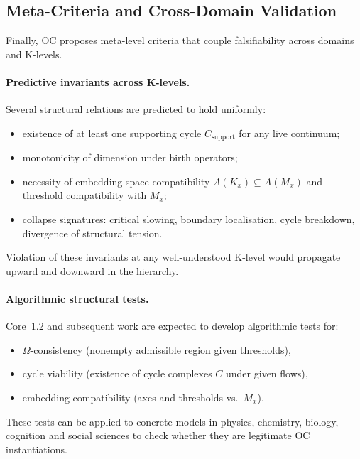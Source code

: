 \subsection{Meta-Criteria and Cross-Domain Validation}

Finally, OC proposes meta-level criteria that couple falsifiability across
domains and K-levels.

\paragraph{Predictive invariants across K-levels.}
Several structural relations are predicted to hold uniformly:
\begin{itemize}
  \item existence of at least one supporting cycle \(C_{\mathrm{support}}\)
        for any live continuum;
  \item monotonicity of dimension under birth operators;
  \item necessity of embedding-space compatibility
        \(A(K_x)\subseteq A(M_x)\) and threshold compatibility with \(M_x\);
  \item collapse signatures: critical slowing, boundary localisation,
        cycle breakdown, divergence of structural tension.
\end{itemize}
Violation of these invariants at any well-understood K-level would
propagate upward and downward in the hierarchy.

\paragraph{Algorithmic structural tests.}
Core~1.2 and subsequent work are expected to develop algorithmic tests for:
\begin{itemize}
  \item \(\Omega\)-consistency (nonempty admissible region given thresholds),
  \item cycle viability (existence of cycle complexes \(C\) under given
        flows),
  \item embedding compatibility (axes and thresholds vs.\ \(M_x\)).
\end{itemize}
These tests can be applied to concrete models in physics, chemistry,
biology, cognition and social sciences to check whether they are legitimate
OC instantiations.

